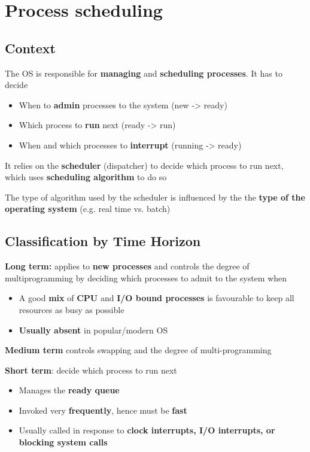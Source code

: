 \documentclass{article}
\begin{document}
\section{Process scheduling}

\subsection{Context}
\begin{flushleft}
The OS is responsible for \textbf{managing} and \textbf{scheduling processes}. It has to decide
\begin{itemize}
	\item When to \textbf{admin} processes to the system (new -> ready)
	\item Which process to \textbf{run} next (ready -> run)
	\item When and which processes to \textbf{interrupt} (running -> ready)
\end{itemize}
It relies on the \textbf{scheduler} (dispatcher) to decide which process to run next, which uses \textbf{scheduling algorithm} to do so

The type of algorithm used by the scheduler is influenced by the the \textbf{type of the operating system} (e.g. real time vs. batch)
\end{flushleft}

\subsection{Classification by Time Horizon}
\begin{flushleft}
\textbf{Long term:} applies to \textbf{new processes} and controls the degree of multiprogramming by deciding which processes to admit to the system when
\begin{itemize}
	\item A good \textbf{mix} of \textbf{CPU} and \textbf{I/O bound processes} is favourable to keep all resources as busy as possible
	\item \textbf{Usually absent} in popular/modern OS
\end{itemize}

\textbf{Medium term}  controls swapping and the degree of multi-programming

\textbf{Short term}: decide which process to run next
\begin{itemize}
	\item Manages the \textbf{ready queue}
	\item Invoked very \textbf{frequently}, hence must be \textbf{fast}
	\item Usually called in response to \textbf{clock interrupts, I/O interrupts, or blocking system calls}
\end{itemize}
\end{flushleft}
\end{document}
